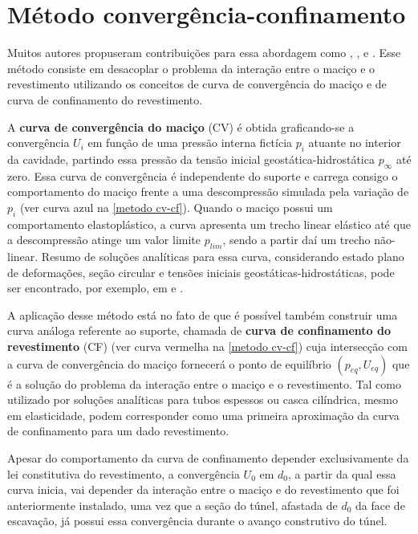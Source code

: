 \section{Método convergência-confinamento}
\label{cap:Método convergência-confinamento}
Muitos autores propuseram contribuições para essa abordagem como , ,  e . Esse método consiste em desacoplar o problema da interação entre o maciço e o revestimento utilizando os conceitos de curva de convergência do maciço e de curva de confinamento do revestimento. 

A \textbf{curva de convergência do maciço} (CV) é obtida graficando-se a convergência $U_i$ em função de uma pressão interna fictícia $p_i$ atuante no interior da cavidade, partindo essa pressão da tensão inicial geostática-hidrostática $p_\infty$ até zero. Essa curva de convergência é independente do suporte e carrega consigo o comportamento do maciço frente a uma descompressão simulada pela variação de $p_i$ (ver curva azul na \autoref{metodo cv-cf}). Quando o maciço possui um comportamento elastoplástico, a curva apresenta um trecho linear elástico até que a descompressão atinge um valor limite $p_{lim}$, sendo a partir daí um trecho não-linear. Resumo de soluções analíticas para essa curva, considerando estado plano de deformações, seção circular e tensões iniciais geostáticas-hidrostáticas, pode ser encontrado, por exemplo, em  e .

A aplicação desse método está no fato de que é possível também construir uma curva análoga referente ao suporte, chamada de \textbf{curva de confinamento do revestimento} (CF) (ver curva vermelha na \autoref{metodo cv-cf}) cuja intersecção com a curva de convergência do maciço fornecerá o ponto de equilíbrio $(p_{eq},U_{eq})$ que é a solução do problema da interação entre o maciço e o revestimento. Tal como utilizado por  soluções analíticas para tubos espessos ou casca cilíndrica, mesmo em elasticidade, podem corresponder como uma primeira aproximação da curva de confinamento para um dado revestimento.

Apesar do comportamento da curva de confinamento depender exclusivamente da lei constitutiva do revestimento, a convergência $U_0$ em $d_0$, a partir da qual essa curva inicia, vai depender da interação entre o maciço e do revestimento que foi anteriormente instalado, uma vez que a seção do túnel, afastada de $d_0$ da face de escavação, já possui essa convergência durante o avanço construtivo do túnel.

